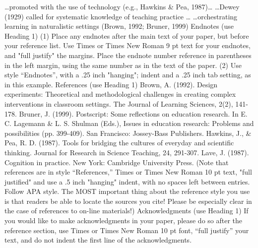 \documentclass{article}
\begin{document}
\dots promoted with the use of technology (e.g., Hawkins \& Pea, 1987)\dots
\dots Dewey (1929) called for systematic knowledge of teaching practice \dots
\dots orchestrating learning in naturalistic settings (Brown, 1992; Bruner, 1999)
Endnotes (use Heading 1)
(1) Place any endnotes after the main text of your paper, but before your reference list. Use Times or Times New Roman 9
pt text for your endnotes, and "full justify" the margins. Place the endnote number reference in parentheses in the left
margin, using the same number as in the text of the paper.
(2) Use style “Endnotes”, with a .25 inch "hanging"; indent and a .25 inch tab setting, as in this example.
References (use Heading 1)
Brown, A. (1992). Design experiments: Theoretical and methodological challenges in creating complex
interventions in classroom settings. The Journal of Learning Sciences, 2(2), 141-178.
Bruner, J. (1999). Postscript: Some reflections on education research. In E. C. Lagemann \& L. S.
Shulman (Eds.), Issues in education research: Problems and possibilities (pp. 399-409). San
Francisco: Jossey-Bass Publishers.
Hawkins, J., \& Pea, R. D. (1987). Tools for bridging the cultures of everyday and scientific thinking. Journal
for Research in Science Teaching, 24, 291-307.
Lave, J. (1987). Cognition in practice. New York: Cambridge University Press.
(Note that references are in style “References,” Times or Times New Roman 10 pt text, "full justified" and use a
.5 inch "hanging" indent, with no spaces left between entries. Follow APA style. The MOST important thing
about the reference style you use is that readers be able to locate the sources you cite! Please be especially clear
in the case of references to on-line materials!)
Acknowledgments (use Heading 1)
If you would like to make acknowledgments in your paper, please do so after the reference section, use Times or
Times New Roman 10 pt font, “full justify” your text, and do not indent the first line of the acknowledgments.
\end{document}
